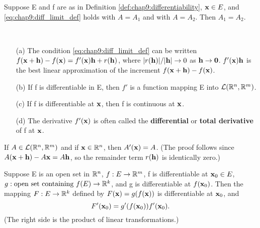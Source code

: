 \begin{theorem}
  \label{thm:chap9:uniqueness_derivative}
  Suppose E and f are as in Definition
  \ref{def:chap9:differentiability}, $\mathbf{x} \in E$, and
  \eqref{eq:chap9:diff_limit_def} holds with $A=A_1$ and with
  $A=A_2$. Then $A_1 = A_2$.
\end{theorem}

\begin{remark}
  \label{rem:chap9:diff_remarks}
  ~ %
  \begin{enumerate}
    \item[(a)] The condition \eqref{eq:chap9:diff_limit_def} can be
      written $f(\mathbf{x}+\mathbf{h}) - f(\mathbf{x}) =
      f'(\mathbf{x})\mathbf{h} + r(\mathbf{h})$, where
      $|r(\mathbf{h})|/|\mathbf{h}| \to 0$ as $\mathbf{h} \to \mathbf{0}$.
      $f'(\mathbf{x})\mathbf{h}$ is the best linear approximation of the
      increment $f(\mathbf{x}+\mathbf{h}) - f(\mathbf{x})$.
    \item[(b)] If f is differentiable in E, then $f'$ is a function
      mapping E into $\mathcal{L}(\mathbb{R}^n, \mathbb{R}^m)$.
    \item[(c)] If f is differentiable at $\mathbf{x}$, then f is
      continuous at $\mathbf{x}$.
    \item[(d)] The derivative $f'(\mathbf{x})$ is often called the
      \textbf{differential} or \textbf{total derivative} of f at $\mathbf{x}$.
  \end{enumerate}
\end{remark}

\begin{example}
  \label{ex:chap9:derivative_linear_map}
  If $A \in \mathcal{L}(\mathbb{R}^n, \mathbb{R}^m)$ and if $\mathbf{x} \in \mathbb{R}^n$, then
  $A'(\mathbf{x}) = A$.
  (The proof follows since $A(\mathbf{x}+\mathbf{h}) - A\mathbf{x} =
  A\mathbf{h}$, so the remainder term $r(\mathbf{h})$ is identically zero.)
\end{example}

\begin{theorem}
  \label{thm:chap9:chain_rule}
  Suppose E is an open set in $\mathbb{R}^n$, $f: E \to \mathbb{R}^m$, f is
  differentiable at $\mathbf{x}_0 \in E$, $g: \text{open set
  containing } f(E) \to \mathbb{R}^k$, and g is differentiable at
  $f(\mathbf{x}_0)$. Then the mapping $F: E \to \mathbb{R}^k$ defined by
  $F(\mathbf{x}) = g(f(\mathbf{x}))$ is differentiable at $\mathbf{x}_0$, and
  \begin{equation*} %
    F'(\vect{x}_0) = g'(f(\vect{x}_0)) f'(\vect{x}_0).
  \end{equation*}
  (The right side is the product of linear transformations.)
\end{theorem}

